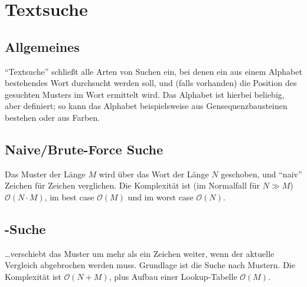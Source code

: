\chapter{Textsuche}
\section{Allgemeines}
\enquote{Textsuche} schließt alle Arten von Suchen ein, bei denen ein aus einem Alphabet bestehendes Wort durchsucht werden soll, und (falls vorhanden) die Position des gesuchten Musters im Wort ermittelt wird.
Das Alphabet ist hierbei beliebig, aber definiert; so kann das Alphabet beispielsweise aus Gensequenzbausteinen bestehen oder aus Farben.

\section{Naive/Brute-Force Suche}
Das Muster der Länge $M$ wird über das Wort der Länge $N$ geschoben, und \enquote{naiv} Zeichen für Zeichen verglichen.
Die Komplexität ist (im Normalfall für $N \gg M$) $\mathcal{O}(N \cdot M)$, im best case $\mathcal{O}(M)$ und im worst case $\mathcal{O}(N)$.

\section{\protect{}-Suche}
\ldots verschiebt das Muster um mehr als ein Zeichen weiter, wenn der aktuelle Vergleich abgebrochen werden muss.
Grundlage ist die Suche nach Mustern.
Die Komplexität ist $\mathcal{O}(N+M)$, plus Aufbau einer Lookup-Tabelle $\mathcal{O}(M)$.

